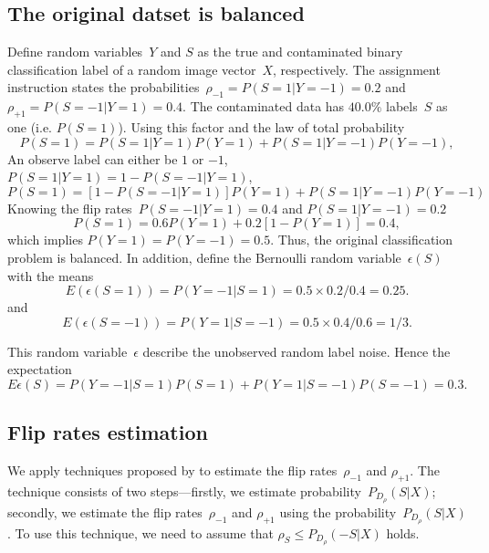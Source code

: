 \documentclass[12pt]{article} %
\newcommand{\rhoo}{\rho_{+1}}
\newcommand{\rhoz}{\rho_{-1}}
\begin{document}
\subsection{The original datset is balanced} \label{sec:1}
Define random variables~$Y$ and $S$ as the true and contaminated binary classification label of a random image vector~$X$, respectively. The assignment instruction states the probabilities~$\rhoz=P(S=1|Y=-1)=0.2$ and $\rhoo=P(S=-1|Y=1)=0.4$.
The contaminated data has $40.0\%$ labels~$S$ as one (i.e. $P(S=1)$). Using this factor and the law of total probability
\begin{equation*}
P(S=1)=P(S=1|Y=1)P(Y=1)+P(S=1|Y=-1)P(Y=-1),
\end{equation*}
An observe label can either be $1$ or $-1$, $P(S=1|Y=1)=1-P(S=-1|Y=1)$,
\begin{equation*}
P(S=1)=\left[1-P(S=-1|Y=1)\right]P(Y=1)+P(S=1|Y=-1)P(Y=-1)
\end{equation*}
Knowing the flip rates~$P(S=-1|Y=1)=0.4$ and $P(S=1|Y=-1)=0.2$
\begin{equation}
P(S=1)=0.6P(Y=1)+0.2\left[1-P(Y=1)\right]=0.4, \label{eq:ps}
\end{equation}
which implies $P(Y=1)=P(Y=-1)=0.5$. Thus, the original classification problem is balanced.
In addition, define the Bernoulli random variable~$\epsilon(S)$ with the means 
\begin{equation}\label{eq:e1}
  E(\epsilon(S=1))=P(Y=-1|S=1)=0.5\times0.2/0.4=0.25.  
\end{equation}
and 
\begin{equation}\label{eq:em1}
  E(\epsilon(S=-1))=P(Y=1|S=-1)=0.5\times0.4/0.6=1/3.  
\end{equation}

This random variable~$\epsilon$ describe the unobserved random label noise. Hence the expectation
\begin{equation}
    E\epsilon(S)=P(Y=-1|S=1)P(S=1)+P(Y=1|S=-1)P(S=-1)
    =0.3.\label{eq:exp}
\end{equation}

\subsection{Flip rates estimation}\label{method2}
We apply techniques proposed by \citet{liu2016classification} to estimate the flip rates~$\rhoz$ and $\rhoo$. The technique consists of two steps---firstly, we estimate probability~$P_{D_\rho}(S|X)$; secondly, we estimate the flip rates~$\rhoz$ and $\rhoo$ using the probability~$P_{D_\rho}(S|X)$.
To use this technique, we need to assume that $\rho_{S}\leq P_{D_\rho}(-S|X)$ holds.
\end{document}
